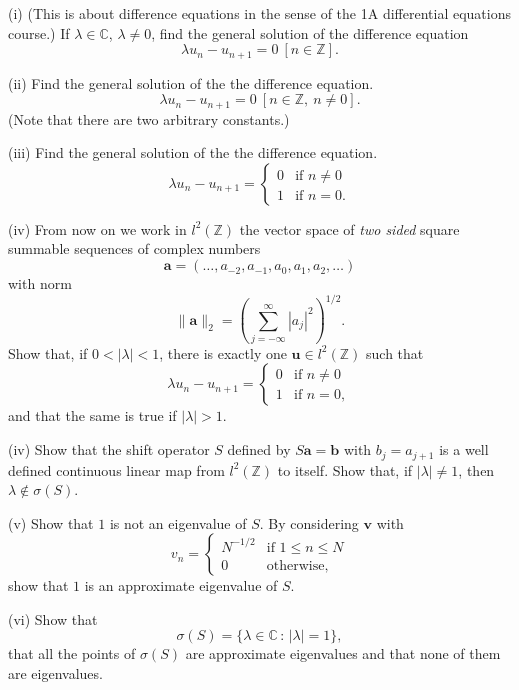 \begin{exercise}\label{C5.16}\label{E;shift spectrum} 
(i) (This is about difference equations in the sense of
the 1A differential equations course.)
If $\lambda\in{\mathbb C}$, $\lambda\neq 0$,
find the general solution of the difference equation
\[\lambda u_{n}-u_{n+1}=0 \ [n\in{\mathbb Z}].\]

(ii) Find the general solution of the
the difference equation.
\[\lambda u_{n}-u_{n+1}=0\ [n\in{\mathbb Z},\ n\neq 0].\]
(Note that there are two arbitrary constants.)

(iii) Find the general solution of the
the difference equation.
\[
\lambda u_{n}-u_{n+1}
=\begin{cases}0&\text{if $n\neq 0$}\\
1&\text{if $n=0$.}
\end{cases}
\]

(iv) From now on we work in $l^{2}({\mathbb Z})$ the vector
space of \emph{two sided} square summable sequences of complex numbers
\[{\mathbf a}=(\dots,a_{-2},a_{-1},a_{0},a_{1},a_{2},\dots)\]
with norm 
\[\|{\mathbf a}\|_{2}
=\left(\sum_{j=-\infty}^{\infty}|a_{j}|^{2}\right)^{1/2}.\]
Show that, if $0<|\lambda|<1$,
there is exactly one ${\mathbf u}\in l^{2}({\mathbb Z})$
such that
\[
\lambda u_{n}-u_{n+1}
=\begin{cases}0&\text{if $n\neq 0$}\\
1&\text{if $n=0$},
\end{cases}
\] 
and that the same is true if $|\lambda|>1$.

(iv) Show that the shift operator $S$ defined by $S{\mathbf a}={\mathbf b}$
with $b_{j}=a_{j+1}$ is a well defined continuous linear map from
$l^{2}({\mathbb Z})$ to itself. Show that, if $|\lambda|\neq 1$,
then $\lambda\notin\sigma(S)$.

(v) Show that $1$ is not an eigenvalue of $S$. By considering
${\mathbf v}$ with
\[
v_{n}=
\begin{cases}N^{-1/2}&\text{if $1\leq n\leq N$}\\
0&\text{otherwise,}
\end{cases}
\] 
show that $1$ is an approximate eigenvalue of $S$.

(vi) Show that
\[\sigma(S)=\{\lambda\in{\mathbb C}\,:\,|\lambda|=1\},\]
that all the points of $\sigma(S)$ are approximate eigenvalues
and that none of them are eigenvalues.
\end{exercise}

